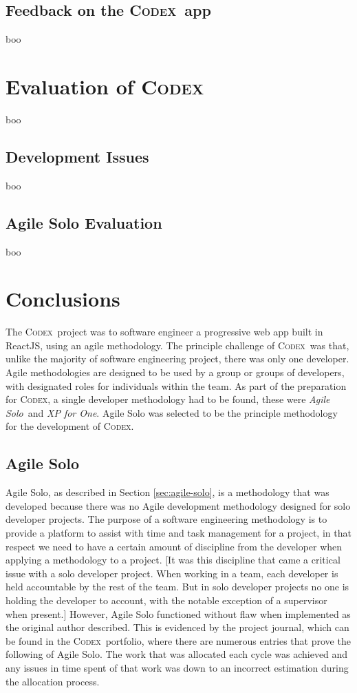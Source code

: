 \documentclass[final]{cmpreport}
\newcommand{\Codex}{\textsc{Codex}}
\newcommand{\AgileSolo}{\emph{Agile Solo}}
\begin{document}
		\subsection{Feedback on the \Codex \ app} \label{sec:feedback}
		boo
		
	\section{Evaluation of \Codex} \label{sec:evaluation}
	boo
	
		\subsection{Development Issues} \label{sec:dev-eval}
		boo
			
		\subsection{Agile Solo Evaluation} \label{sec:agile-solo-eval}
		boo
			
	\section{Conclusions} \label{sec:conclusions}
	The \Codex \ project was to software engineer a progressive web app built in ReactJS, using an agile methodology. The principle challenge of \Codex \ was that, unlike the majority of software engineering project, there was only one developer. Agile methodologies are designed to be used by a group or groups of developers, with designated roles for individuals within the team. As part of the preparation for \Codex, a single developer methodology had to be found, these were \AgileSolo \ and \emph{XP for One}. Agile Solo was selected to be the principle methodology for the development of \Codex. 
	
		\subsection{Agile Solo} \label{sec:agile-solo-conc}
		Agile Solo, as described in Section \ref{sec:agile-solo}, is a methodology that was developed because there was no Agile development methodology designed for solo developer projects. The purpose of a software engineering methodology is to provide a platform to assist with time and task management for a project, in that respect we need to have a certain amount of discipline from the developer when applying a methodology to a project. [It was this discipline that came a critical issue with a solo developer project. When working in a team, each developer is held accountable by the rest of the team. But in solo developer projects no one is holding the developer to account, with the notable exception of a supervisor when present.] However, Agile Solo functioned without flaw when implemented as the original author described. This is evidenced by the project journal, which can be found in the \Codex \ portfolio, where there are numerous entries that prove the following of Agile Solo. The work that was allocated each cycle was achieved and any issues in time spent of that work was down to an incorrect estimation during the allocation process.
		
\end{document}

